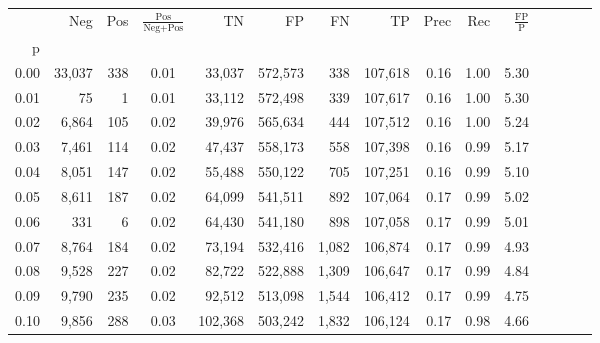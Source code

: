 \begin{tabular}{rrrcrrrrrrrrrrr}
\toprule
{} &     Neg &    Pos & $\frac{\text{Pos}}{\text{Neg}+\text{Pos}}$ &       TN &       FP &       FN &       TP &  Prec &   Rec & $\frac{\text{FP}}{\text{P}}$ \\
p    &         &        &                                            &          &          &          &          &       &       &                              \\
\midrule
0.00 &  33,037 &    338 &                                       0.01 &   33,037 &  572,573 &      338 &  107,618 &  0.16 &  1.00 &                         5.30 \\
0.01 &      75 &      1 &                                       0.01 &   33,112 &  572,498 &      339 &  107,617 &  0.16 &  1.00 &                         5.30 \\
0.02 &   6,864 &    105 &                                       0.02 &   39,976 &  565,634 &      444 &  107,512 &  0.16 &  1.00 &                         5.24 \\
0.03 &   7,461 &    114 &                                       0.02 &   47,437 &  558,173 &      558 &  107,398 &  0.16 &  0.99 &                         5.17 \\
0.04 &   8,051 &    147 &                                       0.02 &   55,488 &  550,122 &      705 &  107,251 &  0.16 &  0.99 &                         5.10 \\
0.05 &   8,611 &    187 &                                       0.02 &   64,099 &  541,511 &      892 &  107,064 &  0.17 &  0.99 &                         5.02 \\
0.06 &     331 &      6 &                                       0.02 &   64,430 &  541,180 &      898 &  107,058 &  0.17 &  0.99 &                         5.01 \\
0.07 &   8,764 &    184 &                                       0.02 &   73,194 &  532,416 &    1,082 &  106,874 &  0.17 &  0.99 &                         4.93 \\
0.08 &   9,528 &    227 &                                       0.02 &   82,722 &  522,888 &    1,309 &  106,647 &  0.17 &  0.99 &                         4.84 \\
0.09 &   9,790 &    235 &                                       0.02 &   92,512 &  513,098 &    1,544 &  106,412 &  0.17 &  0.99 &                         4.75 \\
0.10 &   9,856 &    288 &                                       0.03 &  102,368 &  503,242 &    1,832 &  106,124 &  0.17 &  0.98 &                         4.66 \\

\end{tabular}
